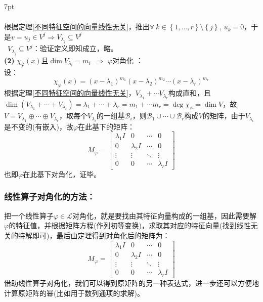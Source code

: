 \documentclass[zihao=-4,UTF8]{report}
\theoremstyle{mystyle} %
\newenvironment{graybox}{%
\def\FrameCommand{%
\hspace{1pt}%
{\color{gray}\small \vrule width 2pt}%
{\color{graybox_color}\vrule width 4pt}%
\colorbox{graybox_color}%
}%
\MakeFramed{\advance\hsize-\width\FrameRestore}%
\noindent\hspace{-4.55pt}%
\begin{adjustwidth}{}{7pt}%
\vspace{2pt}\vspace{2pt}%
}
{%
\vspace{2pt}\end{adjustwidth}\endMakeFramed%
}
\begin{document}
\begin{graybox}
\begin{gather*}
\end{gather*}
根据定理\ref{不同特征空间的向量线性无关}，推出$\forall\ k \in \left\{1,...,r\right\} \setminus \left\{j\right\},\ u_k = 0 $，于是$v = u_j \in V^j \Longrightarrow V_{\lambda_j } \subseteq V^j$\\
\ $V_{\lambda_j} \subseteq V^j$：验证定义即知成立，略。\\
\textbf{(2)} $ \chi_{\varphi}(x)$且$\dim V_{\lambda_i} = m_i$\ $\Longrightarrow$ $\varphi$对角化 ：\\
设：
\begin{equation*}
    \chi_{\varphi}(x) = (x-\lambda_1)^{m_1}(x-\lambda_2)^{m_2} \cdots (x-\lambda_r)^{m_r}
\end{equation*}
根据定理\ref{不同特征空间的向量线性无关}，$V_{\lambda_1} + \cdots V_{\lambda_r}$构成直和，且$\dim \left( V_{\lambda_1} + \cdots+ V_{\lambda_r}\right)  = \lambda_1 + \cdots + \lambda_r = m_1 + \cdots m_r = \deg \chi_\varphi = \dim V$，故$V = V_{\lambda_1} \oplus \cdots \oplus V_{\lambda_r}$，取每个$V_{\lambda_i}$的一组基$\mathcal{B}_i$，则$\mathcal{B}_1 \cup \cdots \cup \mathcal{B}_r $构成$V$的矩阵，由于$V_{\lambda_i}$是不变的(有嵌入)，故$\varphi$在此基下的矩阵：
\begin{equation*}
    M_{\varphi} = \begin{bmatrix}  
        \lambda_1I& 0& \cdots  &  0 \\  
        0& \lambda_2I& \cdots  &  0 \\  
        \vdots & \vdots & \ddots & \vdots \\  
        0& 0& \cdots  & \lambda_rI  
      \end{bmatrix}        
\end{equation*}
也即$\varphi$在此基下对角化，证毕。
\end{graybox}

\subsubsection{线性算子对角化的方法：}
把一个线性算子$\varphi \in \mathscr{L}$对角化，就是要找由其特征向量构成的一组基，因此需要解$\varphi$的特征值，并根据矩阵方程(作列初等变换)，求取其对应的特征向量(找到线性无关的特解即可)，最后由定理得到对角化后的矩阵为：
\begin{equation*}
    M_{\varphi} = \begin{bmatrix}  
        \lambda_1I& 0& \cdots  &  0 \\  
        0& \lambda_2I& \cdots  &  0 \\  
        \vdots & \vdots & \ddots & \vdots \\  
        0& 0& \cdots  & \lambda_rI  
      \end{bmatrix}       
\end{equation*}
{\color{gray}\small 借助线性算子对角化，我们可以得到原矩阵的另一种表达式，进一步还可以方便地计算原矩阵的幂(比如用于数列通项的求解)。}
\end{document}
